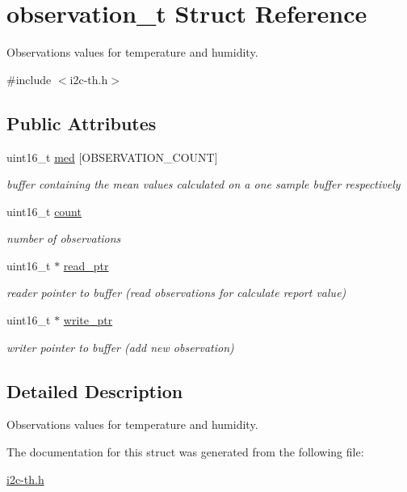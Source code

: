 \hypertarget{structobservation__t}{}\section{observation\+\_\+t Struct Reference}
\label{structobservation__t}


Observations values for temperature and humidity.  




{\ttfamily \#include $<$i2c-\/th.\+h$>$}

\subsection*{Public Attributes}
\begin{DoxyCompactItemize}
\item 
\mbox{\label{structobservation__t_aad8e1d07411a80498c8752203698d051}} 
uint16\+\_\+t \hyperlink{structobservation__t_aad8e1d07411a80498c8752203698d051}{med} \mbox{[}O\+B\+S\+E\+R\+V\+A\+T\+I\+O\+N\+\_\+\+C\+O\+U\+NT\mbox{]}
\begin{DoxyCompactList}\small\item\em buffer containing the mean values calculated on a one sample buffer respectively \end{DoxyCompactList}\item 
\mbox{\label{structobservation__t_ad6f76e88d5cc669742e8d815682e56c2}} 
uint16\+\_\+t \hyperlink{structobservation__t_ad6f76e88d5cc669742e8d815682e56c2}{count}
\begin{DoxyCompactList}\small\item\em number of observations \end{DoxyCompactList}\item 
\mbox{\label{structobservation__t_a0fec54c85b3fcd095772a58c8d877845}} 
uint16\+\_\+t $\ast$ \hyperlink{structobservation__t_a0fec54c85b3fcd095772a58c8d877845}{read\+\_\+ptr}
\begin{DoxyCompactList}\small\item\em reader pointer to buffer (read observations for calculate report value) \end{DoxyCompactList}\item 
\mbox{\label{structobservation__t_aa912e839aff97f27a86387fc765fc7df}} 
uint16\+\_\+t $\ast$ \hyperlink{structobservation__t_aa912e839aff97f27a86387fc765fc7df}{write\+\_\+ptr}
\begin{DoxyCompactList}\small\item\em writer pointer to buffer (add new observation) \end{DoxyCompactList}\end{DoxyCompactItemize}


\subsection{Detailed Description}
Observations values for temperature and humidity. 

The documentation for this struct was generated from the following file\+:\begin{DoxyCompactItemize}
\item 
\hyperlink{i2c-th_8h}{i2c-\/th.\+h}\end{DoxyCompactItemize}
